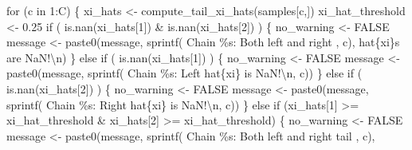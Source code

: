 \documentclass[
  letterpaper,
  DIV=11,
  numbers=noendperiod]{scrartcl}
\newenvironment{Shaded}{\begin{snugshade}}{\end{snugshade}}
\newcommand{\CharTok}[1]{\textcolor[rgb]{0.13,0.47,0.30}{#1}}
\newcommand{\ControlFlowTok}[1]{\textcolor[rgb]{0.00,0.23,0.31}{#1}}
\newcommand{\DecValTok}[1]{\textcolor[rgb]{0.68,0.00,0.00}{#1}}
\newcommand{\FloatTok}[1]{\textcolor[rgb]{0.68,0.00,0.00}{#1}}
\newcommand{\KeywordTok}[1]{\textcolor[rgb]{0.00,0.23,0.31}{#1}}
\newcommand{\NormalTok}[1]{\textcolor[rgb]{0.00,0.23,0.31}{#1}}
\newcommand{\OperatorTok}[1]{\textcolor[rgb]{0.37,0.37,0.37}{#1}}
\newcommand{\SpecialCharTok}[1]{\textcolor[rgb]{0.37,0.37,0.37}{#1}}
\newcommand{\StringTok}[1]{\textcolor[rgb]{0.13,0.47,0.30}{#1}}
\begin{document}
\begin{Shaded}
\begin{Highlighting}[]
  \ControlFlowTok{for}\NormalTok{ (c }\KeywordTok{in} \DecValTok{1}\NormalTok{:C) \{}
\NormalTok{    xi\_hats }\OperatorTok{\textless{}{-}}\NormalTok{ compute\_tail\_xi\_hats(samples[c,])}
\NormalTok{    xi\_hat\_threshold }\OperatorTok{\textless{}{-}} \FloatTok{0.25}
    \ControlFlowTok{if}\NormalTok{ ( }\KeywordTok{is}\NormalTok{.nan(xi\_hats[}\DecValTok{1}\NormalTok{]) }\OperatorTok{\&} \KeywordTok{is}\NormalTok{.nan(xi\_hats[}\DecValTok{2}\NormalTok{]) ) \{}
\NormalTok{      no\_warning }\OperatorTok{\textless{}{-}}\NormalTok{ FALSE}
\NormalTok{      message }\OperatorTok{\textless{}{-}}
\NormalTok{        paste0(message,}
\NormalTok{               sprintf(}\StringTok{\textquotesingle{}  Chain }\SpecialCharTok{\%s}\StringTok{: Both left and right \textquotesingle{}}\NormalTok{, c),}
               \StringTok{\textquotesingle{}hat}\SpecialCharTok{\{xi\}}\StringTok{s are NaN!}\CharTok{\textbackslash{}n}\StringTok{\textquotesingle{}}\NormalTok{)}
\NormalTok{    \} }
    \ControlFlowTok{else} \ControlFlowTok{if}\NormalTok{ ( }\KeywordTok{is}\NormalTok{.nan(xi\_hats[}\DecValTok{1}\NormalTok{]) ) \{}
\NormalTok{      no\_warning }\OperatorTok{\textless{}{-}}\NormalTok{ FALSE}
\NormalTok{      message }\OperatorTok{\textless{}{-}}
\NormalTok{        paste0(message,}
\NormalTok{               sprintf(}\StringTok{\textquotesingle{}  Chain }\SpecialCharTok{\%s}\StringTok{: Left hat}\SpecialCharTok{\{xi\}}\StringTok{ is NaN!}\CharTok{\textbackslash{}n}\StringTok{\textquotesingle{}}\NormalTok{, c))}
\NormalTok{    \} }\ControlFlowTok{else} \ControlFlowTok{if}\NormalTok{ ( }\KeywordTok{is}\NormalTok{.nan(xi\_hats[}\DecValTok{2}\NormalTok{]) ) \{}
\NormalTok{      no\_warning }\OperatorTok{\textless{}{-}}\NormalTok{ FALSE}
\NormalTok{      message }\OperatorTok{\textless{}{-}}
\NormalTok{        paste0(message,}
\NormalTok{               sprintf(}\StringTok{\textquotesingle{}  Chain }\SpecialCharTok{\%s}\StringTok{: Right hat}\SpecialCharTok{\{xi\}}\StringTok{ is NaN!}\CharTok{\textbackslash{}n}\StringTok{\textquotesingle{}}\NormalTok{, c))}
\NormalTok{    \} }\ControlFlowTok{else} \ControlFlowTok{if}\NormalTok{ (xi\_hats[}\DecValTok{1}\NormalTok{] }\OperatorTok{\textgreater{}=}\NormalTok{ xi\_hat\_threshold }\OperatorTok{\&} 
\NormalTok{      xi\_hats[}\DecValTok{2}\NormalTok{] }\OperatorTok{\textgreater{}=}\NormalTok{ xi\_hat\_threshold) \{}
\NormalTok{      no\_warning }\OperatorTok{\textless{}{-}}\NormalTok{ FALSE}
\NormalTok{      message }\OperatorTok{\textless{}{-}}
\NormalTok{        paste0(message,}
\NormalTok{              sprintf(}\StringTok{\textquotesingle{}  Chain }\SpecialCharTok{\%s}\StringTok{: Both left and right tail \textquotesingle{}}\NormalTok{, c),}

\end{Highlighting}
\end{Shaded}
\end{document}
